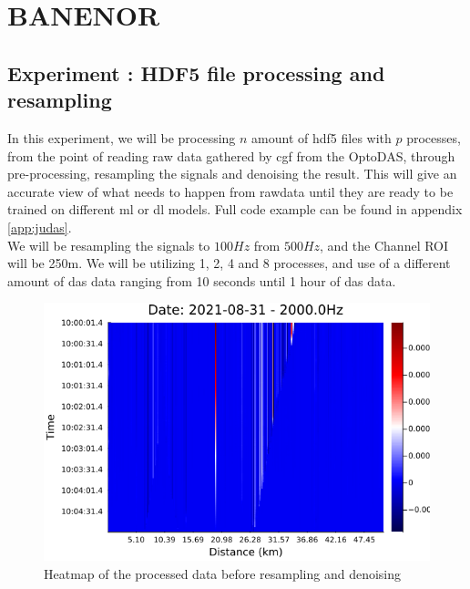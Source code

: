 \section{BANENOR}
\label{res:Judas}


\subsection{Experiment : HDF5 file processing and resampling}

In this experiment, we will be processing $n$ amount of \acrshort{hdf5} files with $p$ processes, from the point of reading raw data gathered by \acrshort{cgf} from the OptoDAS, through pre-processing, resampling the signals and denoising the result. This will give an accurate view of what needs to happen from rawdata until they are ready to be trained on different \acrshort{ml} or \acrshort{dl} models. Full code example can be found in appendix \ref{app:judas}. \\

We will be resampling the signals to $100Hz$ from $500Hz$, and the Channel ROI will be 250m. We will be utilizing 1, 2, 4 and 8 processes, and use of a different amount of \acrshort{das} data ranging from 10 seconds until 1 hour of \acrshort{das} data.

\begin{figure}[!h]
    \centering
    \includegraphics[width=0.8\linewidth]{figures/heatmap_das_test.png}
    \caption{Heatmap of the processed data before resampling and denoising}
    \label{fig:dasoutput}
\end{figure}



